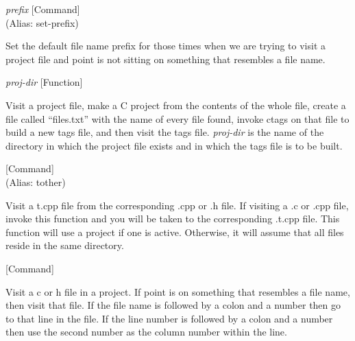 \vspace{1em}
\noindent
{}
\usebox{\funcname}\emph{prefix}
 \hfill [Command]\\%
 (Alias: set-prefix)

\begin{doc-string}
Set the default file name prefix for those times when we are trying to visit
a project file and point is not sitting on something that resembles a file name.
\end{doc-string}

\vspace{1em}
\noindent
{}
\usebox{\funcname}\emph{proj-dir}
 \hfill [Function]

\begin{doc-string}
Visit a project file, make a C project from the contents of the whole file,
create a file called ``files.txt'' with the name of every file found, invoke
ctags on that file to build a new tags file, and then visit the tags file.
\emph{proj-dir} is the name of the directory in which the project file exists and in
which the tags file is to be built.
\end{doc-string}

\vspace{1em}
\noindent
{}
\usebox{\funcname}
 \hfill [Command]\\%
 (Alias: tother)

\begin{doc-string}
Visit a t.cpp file from the corresponding .cpp or .h file.  If visiting a .c
or .cpp file, invoke this function and you will be taken to the corresponding
.t.cpp file.  This function will use a project if one is active.  Otherwise, it
will assume that all files reside in the same directory.
\end{doc-string}

\vspace{1em}
\noindent
{}
\usebox{\funcname}
 \hfill [Command]

\begin{doc-string}
Visit a c or h file in a project.  If point is on something that resembles a file
name, then visit that file.  If the file name is followed by a colon and a number
then go to that line in the file.  If the line number is followed by a colon and
a number then use the second number as the column number within the line.
\end{doc-string}

